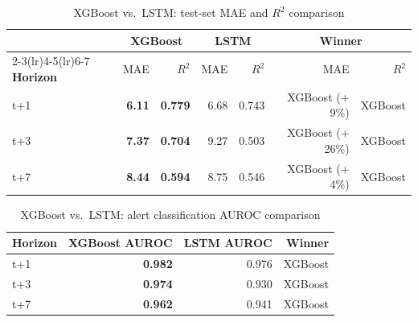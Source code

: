 \documentclass[12pt,a4paper]{report}
\begin{document}
\begin{table}[H]
\centering
\caption{XGBoost vs.\ LSTM: test-set MAE and $R^2$ comparison}
\label{tab:xgb_vs_lstm}
\begin{tabular}{@{}lrrrrrr@{}}
\toprule
 & \multicolumn{2}{c}{\textbf{XGBoost}} & \multicolumn{2}{c}{\textbf{LSTM}} & \multicolumn{2}{c}{\textbf{Winner}} \\
\cmidrule(lr){2-3}\cmidrule(lr){4-5}\cmidrule(lr){6-7}
\textbf{Horizon} & MAE & $R^2$ & MAE & $R^2$ & MAE & $R^2$ \\
\midrule
t+1 & \textbf{6.11} & \textbf{0.779} & 6.68 & 0.743 & XGBoost ($+$9\%) & XGBoost \\
t+3 & \textbf{7.37} & \textbf{0.704} & 9.27 & 0.503 & XGBoost ($+$26\%) & XGBoost \\
t+7 & \textbf{8.44} & \textbf{0.594} & 8.75 & 0.546 & XGBoost ($+$4\%) & XGBoost \\
\bottomrule
\end{tabular}
\end{table}

\begin{table}[H]
\centering
\caption{XGBoost vs.\ LSTM: alert classification AUROC comparison}
\label{tab:xgb_vs_lstm_auroc}
\begin{tabular}{@{}lrrr@{}}
\toprule
\textbf{Horizon} & \textbf{XGBoost AUROC} & \textbf{LSTM AUROC} & \textbf{Winner} \\
\midrule
t+1 & \textbf{0.982} & 0.976 & XGBoost \\
t+3 & \textbf{0.974} & 0.930 & XGBoost \\
t+7 & \textbf{0.962} & 0.941 & XGBoost \\
\bottomrule
\end{tabular}
\end{table}
\end{document}
